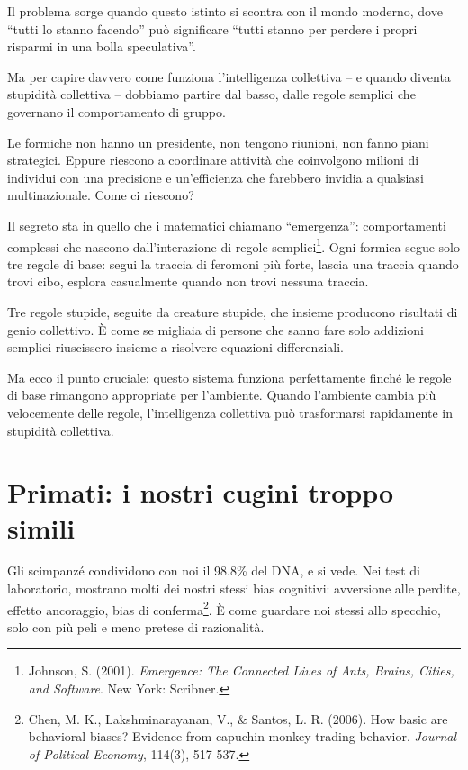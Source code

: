 Il problema sorge quando questo istinto si scontra con il mondo moderno, dove ``tutti lo stanno facendo'' può significare ``tutti stanno per perdere i propri risparmi in una bolla speculativa''.

Ma per capire davvero come funziona l'intelligenza collettiva -- e quando diventa stupidità collettiva -- dobbiamo partire dal basso, dalle regole semplici che governano il comportamento di gruppo.

Le formiche non hanno un presidente, non tengono riunioni, non fanno piani strategici. Eppure riescono a coordinare attività che coinvolgono milioni di individui con una precisione e un'efficienza che farebbero invidia a qualsiasi multinazionale. Come ci riescono?

Il segreto sta in quello che i matematici chiamano ``emergenza'': comportamenti complessi che nascono dall'interazione di regole semplici\footnote{Johnson, S. (2001). \emph{Emergence: The Connected Lives of Ants, Brains, Cities, and Software}. New York: Scribner.}. Ogni formica segue solo tre regole di base: segui la traccia di feromoni più forte, lascia una traccia quando trovi cibo, esplora casualmente quando non trovi nessuna traccia.

Tre regole stupide, seguite da creature stupide, che insieme producono risultati di genio collettivo. È come se migliaia di persone che sanno fare solo addizioni semplici riuscissero insieme a risolvere equazioni differenziali.

Ma ecco il punto cruciale: questo sistema funziona perfettamente finché le regole di base rimangono appropriate per l'ambiente. Quando l'ambiente cambia più velocemente delle regole, l'intelligenza collettiva può trasformarsi rapidamente in stupidità collettiva.

\section{Primati: i nostri cugini troppo simili}

Gli scimpanzé condividono con noi il 98.8\% del DNA, e si vede. Nei test di laboratorio, mostrano molti dei nostri stessi bias cognitivi: avversione alle perdite, effetto ancoraggio, bias di conferma\footnote{Chen, M. K., Lakshminarayanan, V., \& Santos, L. R. (2006). How basic are behavioral biases? Evidence from capuchin monkey trading behavior. \emph{Journal of Political Economy}, 114(3), 517-537.}. È come guardare noi stessi allo specchio, solo con più peli e meno pretese di razionalità.

